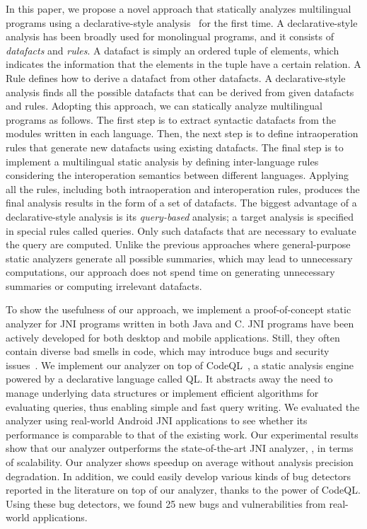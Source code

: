 In this paper, we propose a novel approach that statically analyzes
multilingual programs using a declarative-style analysis~\cite{doop} for the first time.
A declarative-style analysis has been broadly used for monolingual programs,
and it consists of \textit{datafacts} and \textit{rules}.
A datafact is simply an ordered tuple of elements, which indicates the
information that the elements in the tuple have a certain relation.
A Rule defines how to derive a datafact from other datafacts.
A declarative-style analysis finds all the possible datafacts that can
be derived from given datafacts and rules.
Adopting this approach, we can statically analyze multilingual programs as follows.
The first step is to extract syntactic datafacts from the modules written in each language.
Then, the next step is to define intraoperation rules that
generate new datafacts using existing datafacts.
The final step is to implement a multilingual static analysis by defining
inter-language rules considering the interoperation semantics between different languages. 
Applying all the rules, including both intraoperation
and interoperation rules, produces the final analysis results in
the form of a set of datafacts.  The biggest advantage of a declarative-style analysis is its
\textit{query-based} analysis; a target analysis is specified in
special rules called queries. Only such datafacts that are
necessary to evaluate the query are computed.
Unlike the previous approaches where general-purpose static
analyzers generate all possible summaries, which may lead to
unnecessary computations, our approach does not spend time
on generating unnecessary summaries or computing irrelevant datafacts.


To show the usefulness of our approach, we implement a proof-of-concept static
analyzer for JNI programs written in both Java and C.
JNI programs have been actively developed for both desktop and mobile
applications. Still, they often contain diverse bad smells in code,
which may introduce bugs and security
issues~\cite{nishiwaki2012sean, grichi2019state, abidi2019behind, abidi2021multi}.
We implement our analyzer on top of CodeQL~\cite{codeql}, a
static analysis engine powered by a declarative language called QL.
It abstracts away the need to manage underlying data structures or implement
efficient algorithms for evaluating queries, thus enabling simple and fast query writing.
We evaluated the analyzer using real-world Android JNI applications
to see whether its performance is comparable to that of the existing work.
Our experimental results show that our analyzer outperforms the
state-of-the-art JNI analyzer, \jnsaf, in terms of scalability.  Our analyzer
shows  speedup on average without analysis precision degradation.
In addition,  we could easily develop various kinds of bug detectors
reported in the literature on top of our analyzer, thanks to the power of CodeQL.
Using these bug detectors, we found 25 new bugs and
vulnerabilities from real-world applications.

